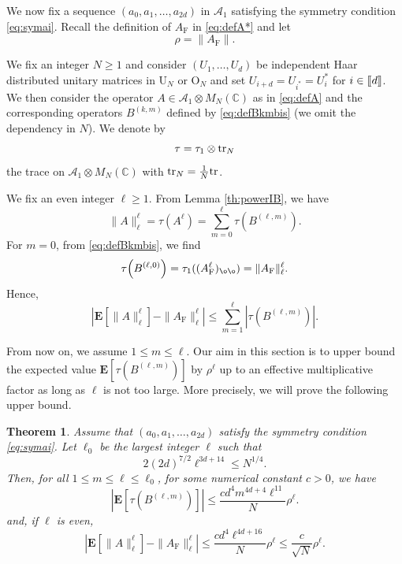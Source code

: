 \documentclass[11pt]{article}
\renewcommand{\star}{{\mathrm{F}}}
\newtheorem{theorem}[lemma]{Theorem}
\newcommand{\cA}{\mathcal{A}}
\newcommand{\tr}{{\rm tr}}
\newcommand{\dE}{\mathbf {E}}
\newcommand{\dU}{\mathrm {U}}
\newcommand{\dO}{\mathrm{O}}
\newcommand{\dC}{\mathbb {C}}
\newcommand{\ABS}[1]{{{\left| #1 \right|}}} %
\newcommand{\SBRA}[1]{{{\left[#1\right]}}} %
\newcommand{\PAR}[1]{{{\left(#1\right)}}} %
\newcommand{\1}{1\!\!{\sf I}}
\newcommand{\INT}[1]{{{\left[\hspace{-1.4pt}\left[#1\right]\hspace{-1.4pt}\right]}}}
\begin{document}
We now fix a sequence $(a_0,a_1, \ldots, a_{2d})$  in $\cA_1$ satisfying the symmetry condition \eqref{eq:symai}. Recall the definition of $A_\star$ in \eqref{eq:defA*} and let 
$$
\rho = \| A_\star\|. 
$$

We fix an integer $N \geq 1$ and consider $(U_1,\ldots, U_d)$ be independent Haar distributed unitary matrices in $\dU_N$ or $\dO_N$ and set $U_{i+d}  = U_{i^*} = U_i^*$ for $i \in \INT{d}$. We then consider the operator $A \in \cA_1 \otimes M_N(\dC)$ as in \eqref{eq:defA} and the corresponding operators $B^{(k,m)}$ defined by \eqref{eq:defBkmbis} (we omit the dependency in $N$). We denote by $$\tau = \tau_1 \otimes \tr_N$$ the trace on $\cA_1 \otimes M_N(\dC)$ with $\tr_N = \frac 1 N \tr$.

We fix an even integer $\ell \geq 1$. From Lemma \ref{th:powerIB}, we have 
\begin{equation*}
 \| A \|_{\ell}^{\ell}  =   \tau \PAR{ A^{\ell}}  = \sum_{m=0}^{\ell} \tau \PAR{ B^{(\ell,m)} }.
\end{equation*}
For $m=0$, from \eqref{eq:defBkmbis}, we find
\begin{equation*}
\tau \PAR{ B^{(\ell,0)} }=  \tau_1 ( (A_\star^{\ell})_{\o \o} )  = \| A_\star\|_\ell^\ell.
\end{equation*}
Hence,
\begin{equation}\label{eq:normAltr}
\ABS{ \dE \SBRA{\| A \|_\ell^\ell} - \| A_\star \|_\ell^\ell }  \leq \sum_{m=1}^\ell \ABS { \tau \PAR{ B^{(\ell,m)} }}.
\end{equation}

From now on, we assume $1 \leq m \leq \ell$.  Our aim in this section is to upper bound the expected value $\dE [ \tau( B^{(\ell,m)} ) ]$ by $\rho^{\ell}$ up to an effective multiplicative factor as long as $\ell$ is not too large. More precisely, we will prove the following upper bound.

\begin{theorem}\label{th:FKBlm}
Assume that $(a_0,a_1,\ldots,a_{2d})$ satisfy  the symmetry condition \eqref{eq:symai}. Let $\ell_0$ be the largest integer $\ell$ such that 
$$
2 (2d)^{7/2} \ell^{3d+ 14} \leq N^{1/4}.
$$
Then, for all $1 \leq m \leq \ell \leq \ell_0$, for some numerical constant $c >0$, we have
$$
\ABS{ \dE \SBRA{\tau \PAR{ B^{(\ell,m)} } }} \leq  \frac{ c d^4  m^{4d +4} \ell^{11}}{N}  \rho^\ell.
$$
and, if $\ell$ is even,
$$
\ABS{ \dE \SBRA{\| A \|_\ell^\ell} - \| A_\star \|_\ell^\ell }  \leq   \frac{  c  d^4  \ell^{4 d + 16}}{ N} \rho^{\ell} \leq \frac{  c }{\sqrt N} \rho^{\ell}.
$$
\end{theorem}
\end{document}
